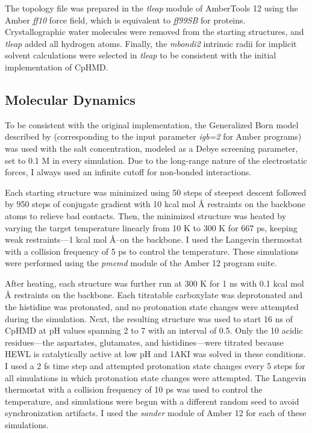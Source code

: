 The topology file was prepared in the \emph{tleap} module of AmberTools 12 using
the Amber \emph{ff10} force field, which is equivalent to \emph{ff99SB}
\cite{Hornak_Proteins_2006_v65_p712} for proteins. Crystallographic water
molecules were removed from the starting structures, and \emph{tleap} added all
hydrogen atoms.  Finally, the \emph{mbondi2} intrinsic radii for implicit
solvent calculations were selected in \emph{tleap} to be consistent with the
initial implementation of CpHMD. \cite{Mongan_JComputChem_2004_v25_p2038}

\subsection{Molecular Dynamics}

To be consistent with the original implementation, the Generalized Born model
described by \citeauthor{Onufriev_Proteins_2004_v55_p383}
\cite{Onufriev_Proteins_2004_v55_p383} (corresponding to the input parameter
\emph{igb=2} for Amber programs) was used with the salt concentration, modeled
as a Debye screening parameter, set to 0.1 M in every simulation.
\cite{Mongan_JComputChem_2004_v25_p2038} Due to the long-range nature of the
electrostatic forces, I always used an infinite cutoff for non-bonded
interactions.

Each starting structure was minimized using 50 steps of steepest descent
followed by 950 steps of conjugate gradient with 10 kcal mol
\AA{} restraints on the backbone atoms to relieve bad contacts. Then,
the minimized structure was heated by varying the target temperature linearly
from 10 K to 300 K for 667 ps, keeping weak restraints---1 kcal mol
\AA{}--on the backbone. I used the Langevin thermostat with a
collision frequency of 5 ps to control the temperature. These
simulations were performed using the \emph{pmemd} module of the Amber 12 program
suite. \cite{AMBER12}

After heating, each structure was further run at 300 K for 1 ns with 0.1 kcal
mol \AA{} restraints on the backbone. Each titratable
carboxylate was deprotonated and the histidine was protonated, and no
protonation state changes were attempted during the simulation. Next, the
resulting structure was used to start 16 ns of CpHMD at pH values spanning 2 to
7 with an interval of 0.5. Only the 10 acidic residues---the aspartates,
glutamates, and histidines---were titrated because HEWL is catalytically active
at low pH \cite{Vocadlo_Nature_2001_v412_p835} and 1AKI was solved in these
conditions. I used a 2 fs time step and attempted protonation state changes
every 5 steps for all simulations in which protonation state changes were
attempted. The Langevin thermostat with a collision frequency of 10
ps was used to control the temperature, and simulations were begun
with a different random seed to avoid synchronization artifacts.
\cite{Sindhikara_JChemTheoryComput_2009_v5_p1624} I used the \emph{sander}
module of Amber 12 for each of these simulations.


